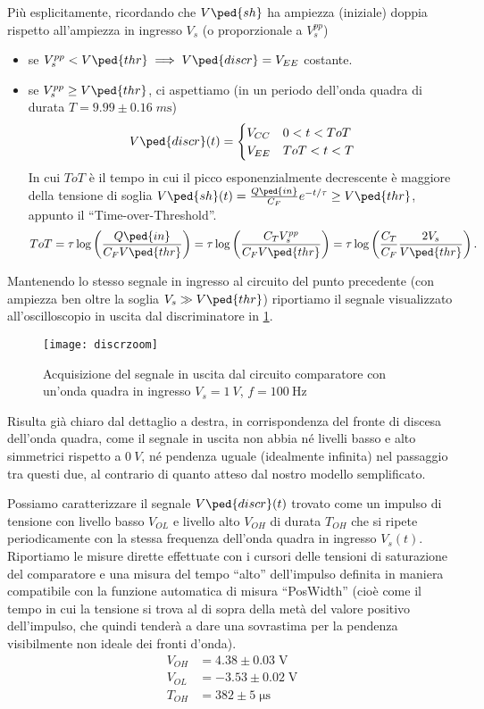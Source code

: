\documentclass[10pt, a4paper, italian]{article}
\begin{document}
Più esplicitamente, ricordando che $V\ped{sh}$ ha ampiezza (iniziale) doppia
rispetto all'ampiezza in ingresso $V_s$ (o proporzionale a $V_s^{pp}$)
\begin{itemize}
\item se $V_s^{pp} < V\ped{thr} \implies V\ped{discr} = V_{EE}$ costante.
\item se $V_s^{pp} \geq V\ped{thr}$, ci aspettiamo (in un periodo dell'onda
quadra di durata $T = 9.99 \pm 0.16 \; \si{m\s}$)
\[
V\ped{discr}(t) =
\begin{cases}
V_{CC} & 0 < t < ToT \\
V_{EE} & ToT < t < T
\end{cases}
\]
In cui $ToT$ è il tempo in cui il picco esponenzialmente decrescente è
maggiore della tensione di soglia
$V\ped{sh}(t) = \frac{Q\ped{in}}{C_F} e^{-t/\tau} \geq V\ped{thr}$, appunto il
``Time-over-Threshold''.
\begin{equation} \label{eq:ToT}
ToT = \tau \log\left(\frac{Q\ped{in}}{C_F V\ped{thr}}\right) =
\tau \log\left(\frac{C_T V_s^{pp}}{C_F V\ped{thr}}\right) = 
\tau \log\left(\frac{C_T}{C_F} \frac{2 V_s}{V\ped{thr}}\right).
\end{equation}
\end{itemize}

Mantenendo lo stesso segnale in ingresso al circuito del punto precedente
(con ampiezza ben oltre la soglia $V_s \gg V\ped{thr}$) riportiamo il
segnale visualizzato all'oscilloscopio in uscita dal discriminatore in
\cref{fig: discr}.
\begin{figure}[htbp]
	\centering
	\texttt{[image: discrzoom]}
	\caption{Acquisizione del segnale in uscita dal circuito comparatore con
	un'onda quadra in ingresso $V_s = \SI{1}{V}$, $f = \SI{100}{\Hz}$
	\label{fig: discr}}
\end{figure}

Risulta già chiaro dal dettaglio a destra, in corrispondenza del fronte di
discesa dell'onda quadra, come il segnale in uscita non abbia né livelli basso
e alto simmetrici rispetto a $\SI{0}{V}$, né pendenza uguale (idealmente
infinita) nel passaggio tra questi due, al contrario di quanto atteso dal
nostro modello semplificato.

Possiamo caratterizzare il segnale $V\ped{discr} (t)$ trovato come un impulso
di tensione con livello basso $V_{OL}$ e livello alto $V_{OH}$ di durata
$T_{OH}$ che si ripete periodicamente con la stessa frequenza dell'onda quadra
in ingresso $V_s (t)$.
Riportiamo le misure dirette effettuate con i cursori
delle tensioni di saturazione del comparatore e una misura del tempo ``alto''
dell'impulso definita in maniera compatibile con la funzione automatica di
misura ``PosWidth'' (cioè come il tempo in cui la tensione si trova al di
sopra della metà del valore positivo dell'impulso, che quindi tenderà a dare
una sovrastima per la pendenza visibilmente non ideale dei fronti d'onda).
\begin{align*}
V_{OH} &= 4.38 \pm 0.03 \; \si{\V} \\
V_{OL} &= -3.53 \pm 0.02 \; \si{\V} \\
T_{OH} &= 382 \pm 5 \; \si{\micro\s}
\end{align*}
\end{document}
